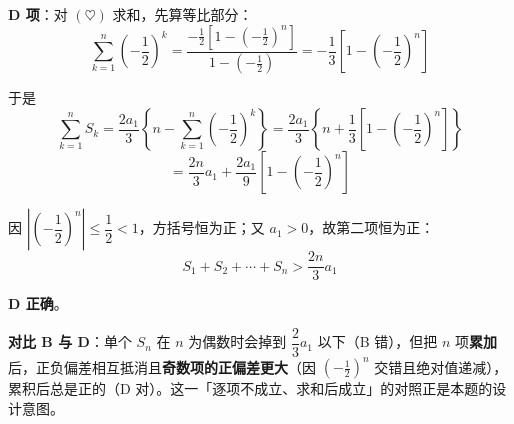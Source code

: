 \begin{answer}
\par\medskip

\textbf{D 项}：对 $(\heartsuit)$ 求和，先算等比部分：
\nopagebreak[4]
\[\sum_{k=1}^{n}\left(-\frac12\right)^k=\frac{-\frac12\left[1-\left(-\frac12\right)^n\right]}{1-\left(-\frac12\right)}=-\frac13\left[1-\left(-\frac12\right)^n\right]\]

于是
\nopagebreak[4]
\[\sum_{k=1}^{n}S_k=\frac{2a_1}{3}\left\{n-\sum_{k=1}^{n}\left(-\frac12\right)^k\right\}=\frac{2a_1}{3}\left\{n+\frac13\left[1-\left(-\frac12\right)^n\right]\right\}\]
\nopagebreak[4]
\[=\frac{2n}{3}a_1+\frac{2a_1}{9}\left[1-\left(-\frac12\right)^n\right]\]

因 $\left|\left(-\dfrac12\right)^n\right|\le\dfrac12<1$，方括号恒为正；又 $a_1>0$，故第二项恒为正：
\nopagebreak[4]
\[S_1+S_2+\cdots+S_n>\frac{2n}{3}a_1\]

 \textbf{D 正确}。

\begin{gktip}
\textbf{对比 B 与 D}：单个 $S_n$ 在 $n$ 为偶数时会掉到 $\dfrac23a_1$ 以下（B 错），但把 $n$ 项\textbf{累加}后，正负偏差相互抵消且\textbf{奇数项的正偏差更大}（因 $\left(-\frac12\right)^n$ 交错且绝对值递减），累积后总是正的（D 对）。这一「逐项不成立、求和后成立」的对照正是本题的设计意图。
\end{gktip}


\par\medskip

\end{answer}

